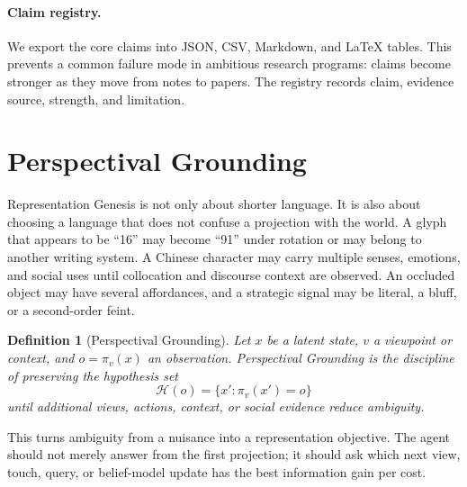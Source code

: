 \documentclass[11pt]{article}
\newtheorem{definition}{Definition}
\begin{document}
\begin{table}[t]
\centering
\small
\caption{Canonical macro counts in the representation-compression study. Generated from \texttt{representation\_compression\_v0.json}.}
\label{tab:representation_compression}

\end{table}

\paragraph{Claim registry.}
We export the core claims into JSON, CSV, Markdown, and LaTeX tables.
This prevents a common failure mode in ambitious research programs: claims become stronger as they move from notes to papers.
The registry records claim, evidence source, strength, and limitation.

\begin{table}[t]
\centering
\scriptsize
\caption{Machine-generated claim registry used to keep Wisdom Science claims auditable.}
\label{tab:claim_registry}

\end{table}

\section{Perspectival Grounding}

Representation Genesis is not only about shorter language.
It is also about choosing a language that does not confuse a projection with the world.
A glyph that appears to be ``16'' may become ``91'' under rotation or may belong to another writing system.
A Chinese character may carry multiple senses, emotions, and social uses until collocation and discourse context are observed.
An occluded object may have several affordances, and a strategic signal may be literal, a bluff, or a second-order feint.

\begin{definition}[Perspectival Grounding]
Let $x$ be a latent state, $v$ a viewpoint or context, and $o=\pi_v(x)$ an observation.
Perspectival Grounding is the discipline of preserving the hypothesis set
\[
\mathcal{H}(o)=\{x':\pi_v(x')=o\}
\]
until additional views, actions, context, or social evidence reduce ambiguity.
\end{definition}

This turns ambiguity from a nuisance into a representation objective.
The agent should not merely answer from the first projection; it should ask which next view, touch, query, or belief-model update has the best information gain per cost.
\end{document}
